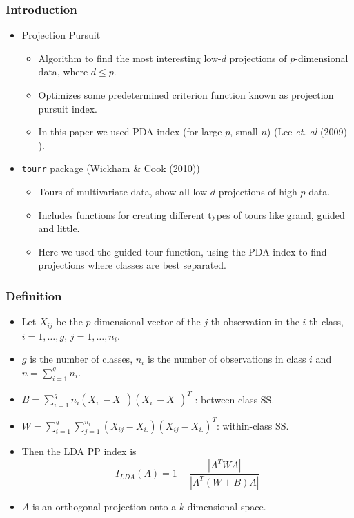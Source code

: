 \documentclass{beamer}
\begin{document}
\begin{frame}
\frametitle{Introduction}
\begin{itemize}
\item Projection Pursuit 
			\begin{itemize}
			\item Algorithm to find the most interesting low-$d$ projections of $p$-dimensional data,  where $d \le p$.
			\item Optimizes some predetermined criterion function known as projection pursuit index.
			\item In this paper we used PDA index (for large $p$, small $n$) (Lee {\em et. al} (2009) ).
			\end{itemize}		
\item \texttt{tourr} package (Wickham \& Cook (2010)) 
			\begin{itemize}
			\item Tours of multivariate data, show all low-$d$ projections of high-$p$ data.  
			\item Includes functions for creating different types of tours like grand, guided and little.
			\item Here we used the guided tour function, using the PDA index to find projections where classes are best separated.
			\end{itemize}
\end{itemize}
\end{frame}


\begin{frame}
\frametitle{Definition}
\begin{itemize}
\item Let $X_{ij}$ be the $p$-dimensional vector of the $j$-th observation in the $i$-th class, $i = 1, \dots, g$, $j = 1, \dots, n_i$.
\item $g$ is the number of classes, $n_i$ is the number of observations in class $i$ and $n = \sum_{i=1}^g n_i$.
\item $B = \sum_{i=1}^g n_i (\bar{X}_{i.} - \bar{X}_{..})(\bar{X}_{i.} - \bar{X}_{..})^T$ : between-class SS.
\item $W = \sum_{i=1}^g \sum_{j=1}^{n_i} (X_{ij} - \bar{X}_{i.})(X_{ij} - \bar{X}_{i.})^T$: within-class SS.
\item Then the LDA PP index is 
$$I_{LDA}(A) = 1 - \frac{|A^TWA|}{|A^T(W + B)A|}$$
\item $A$ is an orthogonal projection onto a $k$-dimensional space.
\end{itemize}
\end{frame}
\end{document}
